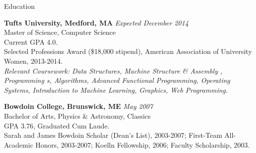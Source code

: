 \documentclass{resume} %
\begin{document}

\begin{rSection}{Education}

{\bf Tufts University, Medford, MA} \hfill {\em Expected December 2014} \\
Master of Science, Computer Science\\
Current GPA 4.0. \smallskip \\
Selected Professions Award (\$18,000 stipend), American Association of University Women, 2013-2014. \smallskip \\
{\em Relevant Coursework: Data Structures, Machine Structure \& Assembly , Programming s, Algorithms, Advanced Functional Programming, Operating Systems, Introduction to Machine Learning, Graphics, Web Programming.}
\smallskip

{\bf Bowdoin College, Brunswick, ME} \hfill {\em  May 2007} \\
Bachelor of Arts, Physics \& Astronomy, Classics \\
GPA 3.76, Graduated Cum Laude.  \smallskip \\
Sarah and James Bowdoin Scholar (Dean's List), 2003-2007; First-Team All-Academic Honors, 2003-2007; Koelln Fellowship, 2006; Faculty Scholarship, 2003. \\
\end{rSection}

\end{document}
